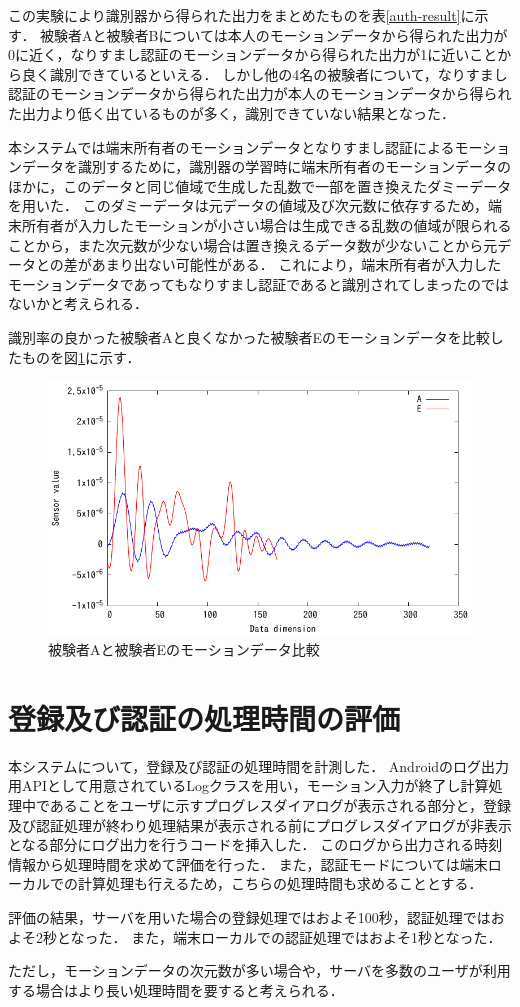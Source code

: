 この実験により識別器から得られた出力をまとめたものを表\ref{auth-result}に示す．
被験者Aと被験者Bについては本人のモーションデータから得られた出力が0に近く，なりすまし認証のモーションデータから得られた出力が1に近いことから良く識別できているといえる．
しかし他の4名の被験者について，なりすまし認証のモーションデータから得られた出力が本人のモーションデータから得られた出力より低く出ているものが多く，識別できていない結果となった．

本システムでは端末所有者のモーションデータとなりすまし認証によるモーションデータを識別するために，識別器の学習時に端末所有者のモーションデータのほかに，このデータと同じ値域で生成した乱数で一部を置き換えたダミーデータを用いた．
このダミーデータは元データの値域及び次元数に依存するため，端末所有者が入力したモーションが小さい場合は生成できる乱数の値域が限られることから，また次元数が少ない場合は置き換えるデータ数が少ないことから元データとの差があまり出ない可能性がある．
これにより，端末所有者が入力したモーションデータであってもなりすまし認証であると識別されてしまったのではないかと考えられる．

識別率の良かった被験者Aと良くなかった被験者Eのモーションデータを比較したものを図\ref{compare}に示す．

\begin{figure}[hbtp]
  \centering
  \includegraphics[bb=0 0 360 216, width=12cm]{Graphs/comp.pdf}
  \caption{被験者Aと被験者Eのモーションデータ比較}
  \label{compare}
\end{figure}

\section{登録及び認証の処理時間の評価}
本システムについて，登録及び認証の処理時間を計測した．
Androidのログ出力用APIとして用意されているLogクラス\cite{5-log}を用い，モーション入力が終了し計算処理中であることをユーザに示すプログレスダイアログが表示される部分と，登録及び認証処理が終わり処理結果が表示される前にプログレスダイアログが非表示となる部分にログ出力を行うコードを挿入した．
このログから出力される時刻情報から処理時間を求めて評価を行った．
また，認証モードについては端末ローカルでの計算処理も行えるため，こちらの処理時間も求めることとする．

評価の結果，サーバを用いた場合の登録処理ではおよそ100秒，認証処理ではおよそ2秒となった．
また，端末ローカルでの認証処理ではおよそ1秒となった．

ただし，モーションデータの次元数が多い場合や，サーバを多数のユーザが利用する場合はより長い処理時間を要すると考えられる．
